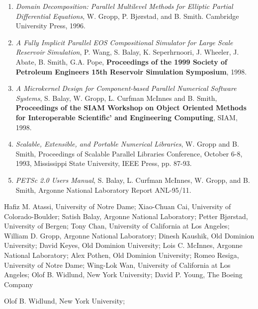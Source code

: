 \itemskip
{}
\begin{enumerate}
\item
{\em Domain Decomposition: Parallel 
              Multilevel Methods for Elliptic Partial Differential Equations},
W. Gropp, P. Bj{\o}rstad, and B. Smith. Cambridge University Press, 1996.
\item {\em  A Fully Implicit Parallel EOS Compositional Simulator for Large Scale 
              Reservoir Simulation}, P. Wang, S. Balay, K. Seperhrnoori, J. Wheeler, 
              J. Abate, B. Smith, G.A. Pope, {\bf Proceedings of the 1999 Society of Petroleum Engineers
              15th Reservoir Simulation Symposium}, 1998.
\item {\em A Microkernel Design for
              Component-based Parallel Numerical Software Systems},
              S. Balay, W. Gropp, L. Curfman McInnes and B. Smith, 
              {\bf Proceedings 
              of the SIAM Workshop on Object Oriented Methods for Interoperable Scientific'
              and Engineering Computing}, SIAM, 1998.
\item {\em  Scalable, Extensible, and Portable
              Numerical Libraries}, W. Gropp and B. Smith, Proceedings of
              Scalable Parallel Libraries Conference, 
              October 6-8, 1993, Mississippi State University, IEEE Press,
              pp. 87-93.
\item {\em PETSc 2.0 Users 
             Manual}, S. Balay, L. Curfman McInnes, W. Gropp, and B. Smith,
             Argonne National Laboratory Report ANL-95/11.
\end{enumerate}

\itemskip
{}
\begin{description}
\item
Hafiz M. Atassi, University of Notre Dame;
Xiao-Chuan Cai, University of Colorado-Boulder;
Satish Balay, Argonne National Laboratory;
Petter Bj{\o}rstad, University of Bergen;
Tony Chan, University of California at Los Angeles;
William D. Gropp, Argonne National Laboratory;
Dinesh Kaushik, Old Dominion University;
David Keyes, Old Dominion University;
Lois C. McInnes, Argonne National Laboratory;
Alex Pothen, Old Dominion University;
Romeo Resiga, University of Notre Dame;
Wing-Lok Wan, University of California at Los Angeles;
Olof B. Widlund, New York University;
David P. Young, The Boeing Company
\end{description}



\itemskip
{} 
\begin{description}
\item
Olof B. Widlund, New York University;
\end{description}





